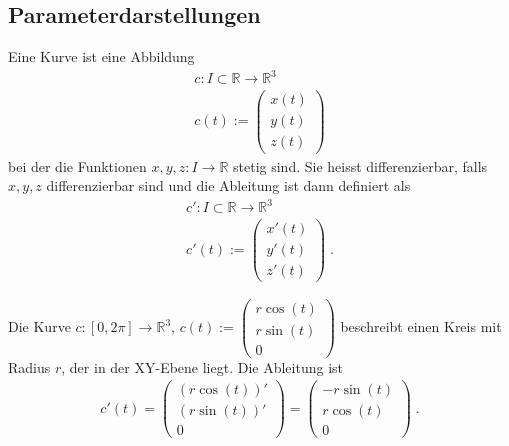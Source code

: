 \subsection{Parameterdarstellungen}

\begin{Definition}
Eine Kurve ist eine  Abbildung 
\begin{align*}
c: I \subset \mathbb{R} \to \mathbb{R}^3 \\
c(t) := \begin{pmatrix} x(t) \\  y(t) \\ z(t) \end{pmatrix}
\end{align*}
bei der die Funktionen $x, y, z : I \to \mathbb{R}$ stetig sind. Sie heisst differenzierbar, falls $x,y,z$ differenzierbar sind und die Ableitung ist dann definiert als 
\begin{align*}
c': I \subset \mathbb{R} \to \mathbb{R}^3 \\
c'(t) := \begin{pmatrix} x'(t) \\  y'(t) \\ z'(t) \end{pmatrix} \; .
\end{align*}
 \end{Definition}

\begin{Beispiel}
Die Kurve 
$c : [0, 2\pi]  \to  \mathbb{R}^3$, $c(t) :=  \begin{pmatrix} r \cos(t) \\ r  \sin(t) \\  0 \end{pmatrix}$
beschreibt einen Kreis mit Radius $r$, der in der XY-Ebene liegt. Die Ableitung ist
\begin{align*}
c'(t) =  \begin{pmatrix} (r \cos(t))' \\  (r\sin(t))' \\  0 \end{pmatrix} = \begin{pmatrix} -r \sin(t) \\ r \cos(t) \\  0 \end{pmatrix} \;.
\end{align*} 
\end{Beispiel}

